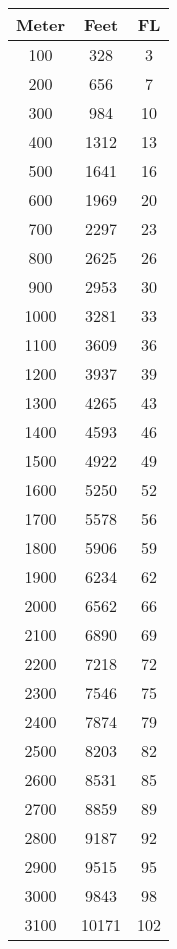 \documentclass[10pt]{article}
\begin{document}
\begin{table}[!ht]
  \centering
  \tiny
  \begin{tabular}{|c|c|c|}
  \hline
  \cellcolor{black!90}\color{white}\textbf{Meter} & \cellcolor{black!90}\color{white}\textbf{Feet} & \cellcolor{black!90}\color{white}\textbf{FL} \\ \hline
      100 & 328 & 3 \\ \hline
      200 & 656 & 7 \\ \hline
      300 & 984 & 10 \\ \hline
      400 & 1312 & 13 \\ \hline
      500 & 1641 & 16 \\ \hline
      600 & 1969 & 20 \\ \hline
      700 & 2297 & 23 \\ \hline
      800 & 2625 & 26 \\ \hline
      900 & 2953 & 30 \\ \hline
      1000 & 3281 & 33 \\ \hline
      1100 & 3609 & 36 \\ \hline
      1200 & 3937 & 39 \\ \hline
      1300 & 4265 & 43 \\ \hline
      1400 & 4593 & 46 \\ \hline
      1500 & 4922 & 49 \\ \hline
      1600 & 5250 & 52 \\ \hline
      1700 & 5578 & 56 \\ \hline
      1800 & 5906 & 59 \\ \hline
      1900 & 6234 & 62 \\ \hline
      2000 & 6562 & 66 \\ \hline
      2100 & 6890 & 69 \\ \hline
      2200 & 7218 & 72 \\ \hline
      2300 & 7546 & 75 \\ \hline
      2400 & 7874 & 79 \\ \hline
      2500 & 8203 & 82 \\ \hline
      2600 & 8531 & 85 \\ \hline
      2700 & 8859 & 89 \\ \hline
      2800 & 9187 & 92 \\ \hline
      2900 & 9515 & 95 \\ \hline
      3000 & 9843 & 98 \\ \hline
      3100 & 10171 & 102 \\ \hline

\end{tabular}
\end{table}
\end{document}
